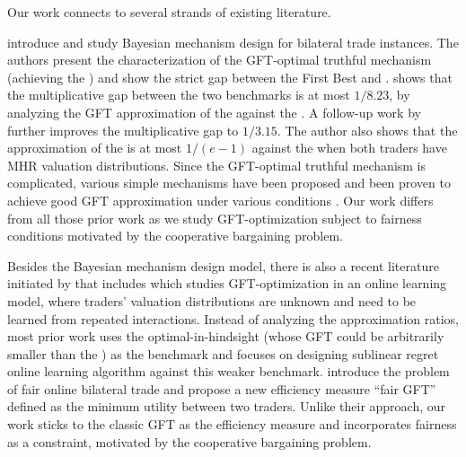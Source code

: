 Our work connects to several strands of existing literature. 

\citet{MS-83} introduce and study Bayesian mechanism design for bilateral trade instances. The authors present the characterization of the GFT-optimal truthful mechanism (achieving the {\SecondBest}) and show the strict gap between the First Best and {\SecondBest}. \citet{DMSW-22} shows that the multiplicative gap between the two benchmarks is at most $1/8.23$, by analyzing the GFT approximation of the {\RandomOffer} against the {\FirstBest}. A follow-up work by \citet{Fei-22} further improves the multiplicative gap to $1/3.15$. The author also shows that the approximation of the {\RandomOffer} is at most $1/(e - 1)$ against the {\FirstBest} when both traders have MHR valuation distributions. Since the GFT-optimal truthful mechanism is complicated, various simple mechanisms have been proposed and been proven to achieve good GFT approximation under various conditions \citep[e.g.,][]{mca-92,BNP-09,BM-16,DTR-17,BCWZ-17,CGKLT-17,BCGZ-18,BGG-20,CLMZ-24,HHPS-25}. Our work differs from all those prior work as we study GFT-optimization subject to fairness conditions motivated by the cooperative bargaining problem.

Besides the Bayesian mechanism design model, there is also a recent literature initiated by \citet{CCCFL-24a} that includes \citep{BCCC-24,BCCF-24,CCCFL-24b,AFF-24} which studies
GFT-optimization in an online learning model, where traders' valuation distributions are unknown and need to be learned from repeated interactions. Instead of analyzing the approximation ratios, most prior work uses the optimal-in-hindsight {\FixPrice} (whose GFT could be arbitrarily smaller than the {\SecondBest}) as the benchmark   and focuses on designing sublinear regret online learning algorithm against this weaker benchmark. \citet{BCCC-24} introduce the problem of fair online bilateral trade and propose a new efficiency measure ``fair GFT'' defined as the minimum utility between two traders. Unlike their approach, our work sticks to the classic GFT as the efficiency measure and incorporates fairness as a constraint, motivated by the cooperative bargaining problem. 

